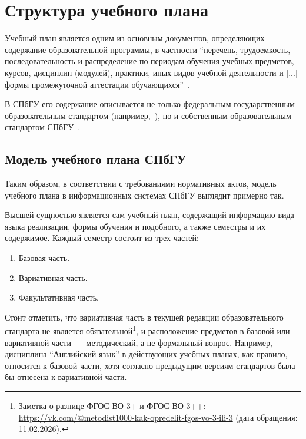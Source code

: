 
\section{Структура учебного плана}
\label{sec:relatedworks}

Учебный план является одним из основным документов, определяющих содержание образовательной программы, в частности \enquote{перечень, трудоемкость, последовательность и распределение по периодам обучения учебных предметов, курсов, дисциплин (модулей), практики, иных видов учебной деятельности и [...] формы промежуточной аттестации обучающихся}~\cite[п. 22]{Statya2Osnovnye}.

В СПбГУ его содержание описывается не только федеральным государственным образовательным стандартом (например,~\cite{PrikazMinisterstvaObrazovaniya}), но и собственным образовательным стандартом СПбГУ~\cite{ObrazovatelnyeStandartyTrebovaniya}.

\subsection{Модель учебного плана СПбГУ}

Таким образом, в соответствии с требованиями нормативных актов, модель учебного плана в информационных системах СПбГУ выглядит примерно так.

Высшей сущностью является сам учебный план, содержащий информацию вида языка реализации, формы обучения и подобного, а также семестры и их содержимое.
Каждый семестр состоит из трех частей:
\begin{enumerate}
    \item Базовая часть.
    \item Вариативная часть.
    \item Факультативная часть.
\end{enumerate}

Стоит отметить, что вариативная часть в текущей редакции образовательного стандарта не является обязательной\footnote{Заметка о разнице ФГОС ВО 3+ и ФГОС ВО 3++: \url{https://vk.com/@metodist1000-kak-opredelit-fgos-vo-3-ili-3} (дата обращения: 11.02.2026).}, и расположение предметов в базовой
или вариативной части~--- методический, а не формальный вопрос.
Например, дисциплина \enquote{Английский язык} в действующих учебных планах, как правило, относится к базовой части, хотя согласно предыдущим версиям стандартов была бы отнесена к вариативной части.

